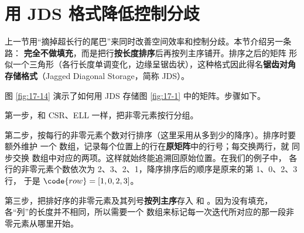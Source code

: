 \section{用 JDS 格式降低控制分歧}
\label{sec:spmv-jds}

上一节用“摘掉超长行的尾巴”来同时改善空间效率和控制分歧。本节介绍另一条路：
\textbf{完全不做填充}，而是把行\textbf{按长度排序}后再按列主序铺开。排序之后的矩阵
形似一个三角形（各行长度单调变化，边缘呈锯齿状），这种格式因此得名\textbf{锯齿对角
存储格式}（Jagged Diagonal Storage，简称 JDS）。

图 \ref{fig:17-14} 演示了如何用 JDS 存储图 \ref{fig:17-1} 中的矩阵。步骤如下。

第一步，和 CSR、ELL 一样，把非零元素按行分组。

第二步，按每行的非零元素个数对行排序（这里采用从多到少的降序）。排序时要额外维护
一个  数组，记录每个位置上的行在\textbf{原矩阵}中的行号；每交换两行，就
同步交换  数组中对应的两项。这样就始终能追溯回原始位置。在我们的例子中，
各行的非零元素个数依次为 2、3、2、1，降序排序后的顺序是原来的第 1、0、2、3 行，
于是 $\code{row}=[1,0,2,3]$。

第三步，把排好序的非零元素及其列号\textbf{按列主序}存入  和
。因为没有填充，各“列”的长度并不相同，所以需要一个 
数组来标记每一次迭代所对应的那一段非零元素从哪里开始。

